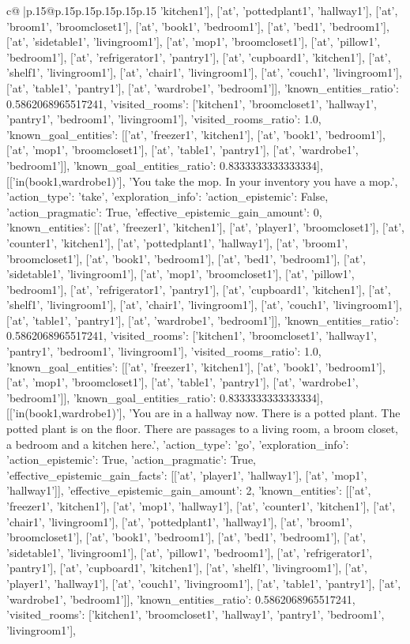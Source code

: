 \documentclass{article}
\begin{document}
{\begin{supertabular}{c@{$\;$}|p{.15\linewidth}@{}p{.15\linewidth}p{.15\linewidth}p{.15\linewidth}p{.15\linewidth}p{.15\linewidth}}
{{{'kitchen1'], ['at', 'pottedplant1', 'hallway1'], ['at', 'broom1', 'broomcloset1'], ['at', 'book1', 'bedroom1'], ['at', 'bed1', 'bedroom1'], ['at', 'sidetable1', 'livingroom1'], ['at', 'mop1', 'broomcloset1'], ['at', 'pillow1', 'bedroom1'], ['at', 'refrigerator1', 'pantry1'], ['at', 'cupboard1', 'kitchen1'], ['at', 'shelf1', 'livingroom1'], ['at', 'chair1', 'livingroom1'], ['at', 'couch1', 'livingroom1'], ['at', 'table1', 'pantry1'], ['at', 'wardrobe1', 'bedroom1']], 'known_entities_ratio': 0.5862068965517241, 'visited_rooms': ['kitchen1', 'broomcloset1', 'hallway1', 'pantry1', 'bedroom1', 'livingroom1'], 'visited_rooms_ratio': 1.0, 'known_goal_entities': [['at', 'freezer1', 'kitchen1'], ['at', 'book1', 'bedroom1'], ['at', 'mop1', 'broomcloset1'], ['at', 'table1', 'pantry1'], ['at', 'wardrobe1', 'bedroom1']], 'known_goal_entities_ratio': 0.8333333333333334}}], [['in(book1,wardrobe1)'], 'You take the mop. In your inventory you have a mop.', {'action_type': 'take', 'exploration_info': {'action_epistemic': False, 'action_pragmatic': True, 'effective_epistemic_gain_amount': 0, 'known_entities': [['at', 'freezer1', 'kitchen1'], ['at', 'player1', 'broomcloset1'], ['at', 'counter1', 'kitchen1'], ['at', 'pottedplant1', 'hallway1'], ['at', 'broom1', 'broomcloset1'], ['at', 'book1', 'bedroom1'], ['at', 'bed1', 'bedroom1'], ['at', 'sidetable1', 'livingroom1'], ['at', 'mop1', 'broomcloset1'], ['at', 'pillow1', 'bedroom1'], ['at', 'refrigerator1', 'pantry1'], ['at', 'cupboard1', 'kitchen1'], ['at', 'shelf1', 'livingroom1'], ['at', 'chair1', 'livingroom1'], ['at', 'couch1', 'livingroom1'], ['at', 'table1', 'pantry1'], ['at', 'wardrobe1', 'bedroom1']], 'known_entities_ratio': 0.5862068965517241, 'visited_rooms': ['kitchen1', 'broomcloset1', 'hallway1', 'pantry1', 'bedroom1', 'livingroom1'], 'visited_rooms_ratio': 1.0, 'known_goal_entities': [['at', 'freezer1', 'kitchen1'], ['at', 'book1', 'bedroom1'], ['at', 'mop1', 'broomcloset1'], ['at', 'table1', 'pantry1'], ['at', 'wardrobe1', 'bedroom1']], 'known_goal_entities_ratio': 0.8333333333333334}}], [['in(book1,wardrobe1)'], 'You are in a hallway now. There is a potted plant. The potted plant is on the floor. There are passages to a living room, a broom closet, a bedroom and a kitchen here.', {'action_type': 'go', 'exploration_info': {'action_epistemic': True, 'action_pragmatic': True, 'effective_epistemic_gain_facts': [['at', 'player1', 'hallway1'], ['at', 'mop1', 'hallway1']], 'effective_epistemic_gain_amount': 2, 'known_entities': [['at', 'freezer1', 'kitchen1'], ['at', 'mop1', 'hallway1'], ['at', 'counter1', 'kitchen1'], ['at', 'chair1', 'livingroom1'], ['at', 'pottedplant1', 'hallway1'], ['at', 'broom1', 'broomcloset1'], ['at', 'book1', 'bedroom1'], ['at', 'bed1', 'bedroom1'], ['at', 'sidetable1', 'livingroom1'], ['at', 'pillow1', 'bedroom1'], ['at', 'refrigerator1', 'pantry1'], ['at', 'cupboard1', 'kitchen1'], ['at', 'shelf1', 'livingroom1'], ['at', 'player1', 'hallway1'], ['at', 'couch1', 'livingroom1'], ['at', 'table1', 'pantry1'], ['at', 'wardrobe1', 'bedroom1']], 'known_entities_ratio': 0.5862068965517241, 'visited_rooms': ['kitchen1', 'broomcloset1', 'hallway1', 'pantry1', 'bedroom1', 'livingroom1'], }}}
\end{supertabular}}
\end{document}
